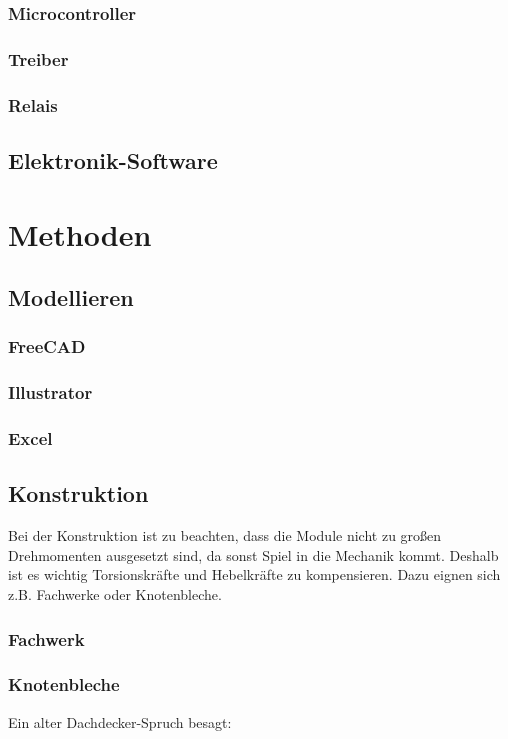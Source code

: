 \documentclass[
	a4paper,
	smallheadings,
	german,
	]
	{scrreprt}
\begin{document}
	\subsection{Microcontroller}
	\subsection{Treiber}
	\subsection{Relais}
\section{Elektronik-Software}

\chapter{Methoden}

\section{Modellieren}
	\subsection{FreeCAD}
	\subsection{Illustrator}
	\subsection{Excel}
\section{Konstruktion}
Bei der Konstruktion ist zu beachten, dass die Module nicht zu großen Drehmomenten ausgesetzt sind, da sonst Spiel in die Mechanik kommt.
Deshalb ist es wichtig Torsionskräfte und Hebelkräfte zu kompensieren.
Dazu eignen sich z.B. Fachwerke oder Knotenbleche.
	\subsection{Fachwerk}
	\subsection{Knotenbleche}
Ein alter Dachdecker-Spruch besagt: 
\end{document}
